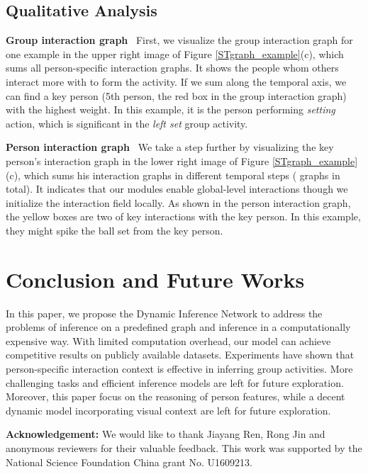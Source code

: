 \documentclass[10pt,twocolumn,letterpaper]{article}
\begin{document}
\subsection{Qualitative Analysis}

\textbf{Group interaction graph} \ First, we visualize the group interaction graph for one example in the upper right image of Figure \ref{STgraph_example}(c), which sums all person-specific interaction graphs. It shows the people whom others interact more with to form the activity. If we sum along the temporal axis, we can find a key person (5th person, the red box in the group interaction graph) with the highest weight. In this example, it is the person performing \textit{setting} action, which is significant in the \textit{left set} group activity.  


\textbf{Person interaction graph} \ We take a step further by visualizing the key person's interaction graph in the lower right image of Figure \ref{STgraph_example}(c), which sums his interaction graphs in different temporal steps ( graphs in total). It indicates that our modules enable global-level interactions though we initialize the interaction field locally. As shown in the person interaction graph, the yellow boxes are two of key interactions with the key person. In this example, they might spike the ball set from the key person.

\section{Conclusion and Future Works}
In this paper, we propose the Dynamic Inference Network to address the problems of inference on a predefined graph and inference in a computationally expensive way. With limited computation overhead, our model can achieve competitive results on publicly available datasets. Experiments have shown that person-specific interaction context is effective in inferring group activities. More challenging tasks and efficient inference models are left for future exploration. Moreover, this paper focus on the reasoning of person features, while a decent dynamic model incorporating visual context \cite{yuan2021learningcontext} are left for future exploration.

\noindent\textbf{Acknowledgement:} We would like to thank Jiayang Ren, Rong Jin and anonymous reviewers for their valuable feedback. This work was supported by the National Science Foundation China grant No. U1609213.

{\small


}
\end{document}
